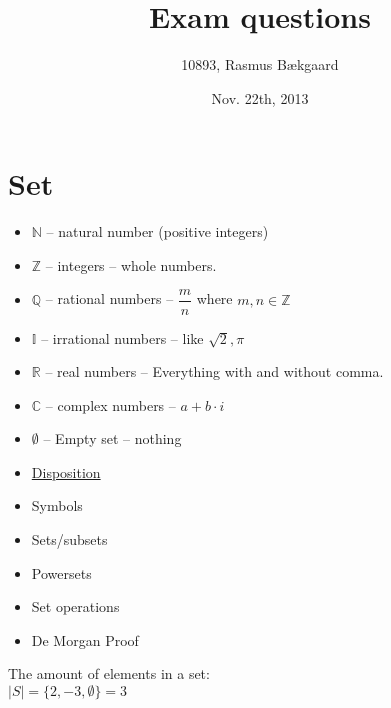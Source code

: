 \documentclass[english,10pt,a4paper]{article}
\title{Exam questions}
\author{10893, Rasmus Bækgaard}
\date{Nov. 22th, 2013}
\begin{document}
\maketitle

\tableofcontents
\newpage

\section{Set}

\begin{minipage}{0.7\linewidth}
\begin{theo}[Symbols] 
\begin{itemize}
\item $\mathbb{N}$ -- natural number (positive integers)
\item $\mathbb{Z}$ -- integers -- whole numbers.
\item $\mathbb{Q}$ -- rational numbers -- $\dfrac{m}{n}$ where $m, n \in \mathbb{Z}$
\item $\mathbb{I}$ -- irrational numbers -- like $\sqrt{2}, \pi$
\item $\mathbb{R}$ -- real numbers -- Everything with and without comma.
\item $\mathbb{C}$ -- complex numbers -- $a+b\cdot i$
\item $\emptyset$ -- Empty set -- nothing
\end{itemize}
\end{theo}
\end{minipage}
\hspace{0.25cm}
\begin{minipage}{0.25\linewidth}
\begin{itemize}
\item[] \underline{Disposition}
\item Symbols
\item Sets/subsets
\item Powersets
\item Set operations
\item De Morgan Proof
\end{itemize}
\end{minipage}

\begin{theo} 
The amount of elements in a set:\\
$|S| = \{ 2, -3, \emptyset\} = 3$

\end{theo}
\end{document}
